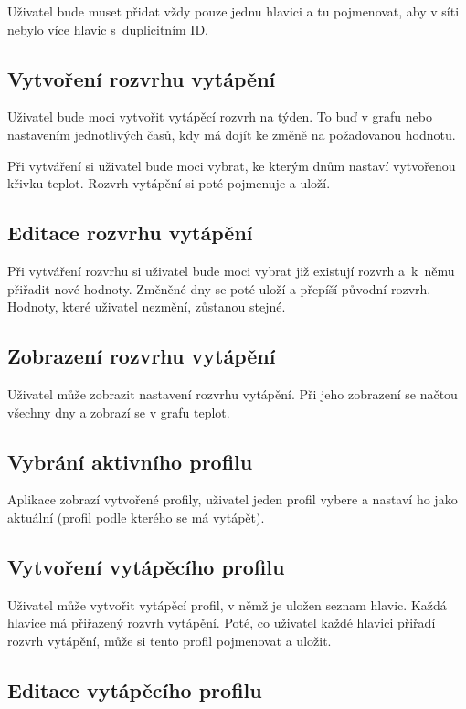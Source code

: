 \documentclass[thesis=B,czech]{FITthesis}[2012/10/20]
\begin{document}
Uživatel bude muset přidat vždy pouze jednu hlavici a tu pojmenovat, aby v síti nebylo více hlavic s~duplicitním ID.


\subsection{Vytvoření rozvrhu vytápění}

Uživatel bude moci vytvořit vytápěcí rozvrh na týden. To buď v grafu nebo nastavením jednotlivých časů, kdy má dojít ke změně na požadovanou hodnotu.

Při vytváření si uživatel bude moci vybrat, ke kterým dnům nastaví vytvořenou křivku teplot. Rozvrh vytápění si poté pojmenuje a uloží.


\subsection{Editace rozvrhu vytápění}

Při vytváření rozvrhu si uživatel bude moci vybrat již existují rozvrh a~k~němu přiřadit nové hodnoty. Změněné dny se poté uloží a přepíší původní rozvrh. Hodnoty, které uživatel nezmění, zůstanou stejné.

\subsection{Zobrazení rozvrhu vytápění}
Uživatel může zobrazit nastavení rozvrhu vytápění. Při jeho zobrazení se načtou všechny dny a zobrazí se v grafu teplot.

\subsection{Vybrání aktivního profilu}

Aplikace zobrazí vytvořené profily, uživatel jeden profil vybere a nastaví ho jako aktuální (profil podle kterého se má vytápět).

\subsection{Vytvoření vytápěcího profilu}

Uživatel může vytvořit vytápěcí profil, v němž je uložen seznam hlavic. Každá hlavice má přiřazený rozvrh vytápění. Poté, co uživatel každé hlavici přiřadí rozvrh vytápění, může si tento profil pojmenovat a uložit.

\subsection{Editace vytápěcího profilu}
\end{document}
